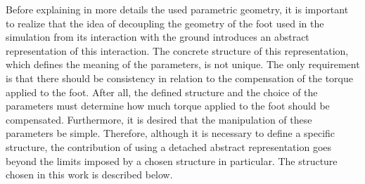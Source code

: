 \documentclass[tog]{acmsiggraph}
\begin{document}
%
Before explaining in more details the used parametric geometry, it is important to realize that the idea of decoupling the geometry of the foot used in the simulation from its interaction with the ground introduces an abstract representation of this interaction. 
The concrete structure of this representation, which defines the meaning of the parameters, is not unique.
The only requirement is that there should be consistency in relation to the compensation of the torque applied to the foot.
After all, the defined structure and the choice of the parameters must determine how much torque applied to the foot should be compensated.
Furthermore, it is desired that the manipulation of these parameters be simple. %
Therefore, although it is necessary to define a specific structure, the contribution of using a detached abstract representation goes beyond the limits imposed by a chosen structure in particular. The structure chosen in this work is described below.


\end{document}
